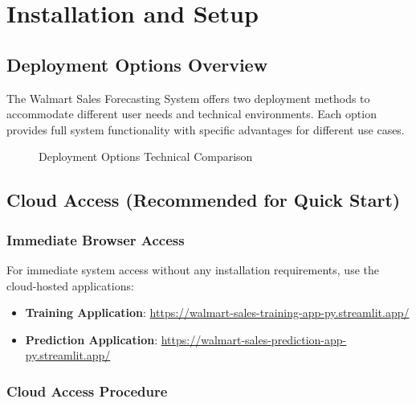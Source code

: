 %
%
%



\chapter{Installation and Setup}

\section{Deployment Options Overview}

The Walmart Sales Forecasting System offers two deployment methods to accommodate different user needs and technical environments. Each option provides full system functionality with specific advantages for different use cases.

\begin{figure}[H]
    \centering
    
    \caption{Deployment Options Technical Comparison}
    \label{fig:deployment_options}
\end{figure}

\section{Cloud Access (Recommended for Quick Start)}

\subsection{Immediate Browser Access}

For immediate system access without any installation requirements, use the cloud-hosted applications:

\begin{itemize}
    \item \textbf{Training Application}: \url{https://walmart-sales-training-app-py.streamlit.app/}
    \item \textbf{Prediction Application}: \url{https://walmart-sales-prediction-app-py.streamlit.app/}
\end{itemize}

\subsection{Cloud Access Procedure}


